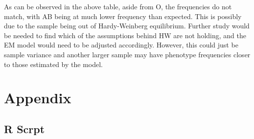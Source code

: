 \documentclass{article}
\begin{document}
	As can be observed in the above table, aside from O, the frequencies do not match, with AB being at much lower frequency than expected. This is possibly due to the sample being out of Hardy-Weinberg equilibrium. Further study would be needed to find which of the assumptions behind HW are not holding, and the EM model would need to be adjusted accordingly. However, this could just be sample variance and another larger sample may have phenotype frequencies closer to those estimated by the model. 
	
	\section{Appendix}
	
	\appendix
	
	\subsection{R Scrpt}
\end{document}
